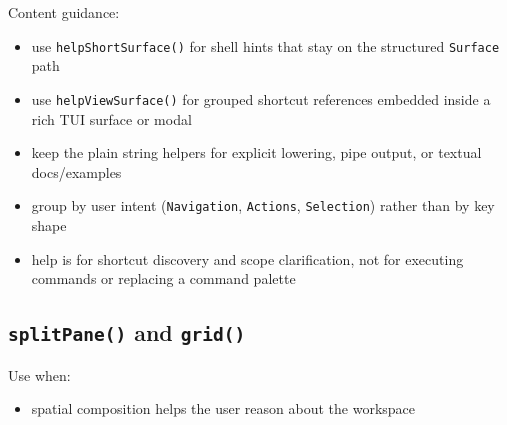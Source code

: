 Content guidance:

\begin{itemize}
\tightlist
\item
  use \texttt{h\allowbreak{}e\allowbreak{}l\allowbreak{}p\allowbreak{}S\allowbreak{}h\allowbreak{}o\allowbreak{}r\allowbreak{}t\allowbreak{}S\allowbreak{}u\allowbreak{}r\allowbreak{}f\allowbreak{}a\allowbreak{}c\allowbreak{}e\allowbreak{}(\allowbreak{})} for shell hints that stay on the structured \texttt{S\allowbreak{}u\allowbreak{}r\allowbreak{}f\allowbreak{}a\allowbreak{}c\allowbreak{}e} path
\item
  use \texttt{h\allowbreak{}e\allowbreak{}l\allowbreak{}p\allowbreak{}V\allowbreak{}i\allowbreak{}e\allowbreak{}w\allowbreak{}S\allowbreak{}u\allowbreak{}r\allowbreak{}f\allowbreak{}a\allowbreak{}c\allowbreak{}e\allowbreak{}(\allowbreak{})} for grouped shortcut references embedded inside a rich TUI surface or modal
\item
  keep the plain string helpers for explicit lowering, pipe output, or textual docs/examples
\item
  group by user intent (\texttt{N\allowbreak{}a\allowbreak{}v\allowbreak{}i\allowbreak{}g\allowbreak{}a\allowbreak{}t\allowbreak{}i\allowbreak{}o\allowbreak{}n}, \texttt{A\allowbreak{}c\allowbreak{}t\allowbreak{}i\allowbreak{}o\allowbreak{}n\allowbreak{}s}, \texttt{S\allowbreak{}e\allowbreak{}l\allowbreak{}e\allowbreak{}c\allowbreak{}t\allowbreak{}i\allowbreak{}o\allowbreak{}n}) rather than by key shape
\item
  help is for shortcut discovery and scope clarification, not for executing commands or replacing a command palette
\end{itemize}

\subsection{\texorpdfstring{\texttt{s\allowbreak{}p\allowbreak{}l\allowbreak{}i\allowbreak{}t\allowbreak{}P\allowbreak{}a\allowbreak{}n\allowbreak{}e\allowbreak{}(\allowbreak{})} and \texttt{g\allowbreak{}r\allowbreak{}i\allowbreak{}d\allowbreak{}(\allowbreak{})}}{ and }}\label{record-023-splitpane-and-grid}

Use when:

\begin{itemize}
\tightlist
\item
  spatial composition helps the user reason about the workspace
\end{itemize}

